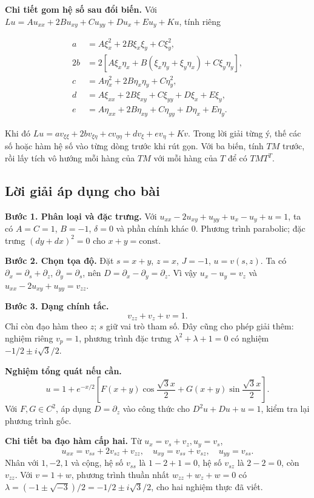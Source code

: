 \documentclass[10pt,a4paper]{article}
\begin{document}
\textbf{Chi tiết gom hệ số sau đổi biến.} Với $Lu=Au_{xx}+2Bu_{xy}+Cu_{yy}+Du_x+Eu_y+Ku$, tính riêng


\[
\begin{aligned}
a&=A\xi_x^2+2B\xi_x\xi_y+C\xi_y^2,\\
2b&=2[A\xi_x\eta_x+B(\xi_x\eta_y+\xi_y\eta_x)+C\xi_y\eta_y],\\
c&=A\eta_x^2+2B\eta_x\eta_y+C\eta_y^2,\\
d&=A\xi_{xx}+2B\xi_{xy}+C\xi_{yy}+D\xi_x+E\xi_y,\\
e&=A\eta_{xx}+2B\eta_{xy}+C\eta_{yy}+D\eta_x+E\eta_y.
\end{aligned}
\]


Khi đó $Lu=av_{\xi\xi}+2bv_{\xi\eta}+cv_{\eta\eta}+dv_\xi+ev_\eta+Kv$. Trong lời giải từng ý, thế các số hoặc hàm hệ số vào từng dòng trước khi rút gọn. Với ba biến, tính $TM$ trước, rồi lấy tích vô hướng mỗi hàng của $TM$ với mỗi hàng của $T$ để có $TMT^T$.
\subsection*{Lời giải áp dụng cho bài}
\textbf{Bước 1. Phân loại và đặc trưng.} Với $u_{xx}-2u_{xy}+u_{yy}+u_x-u_y+u=1$, ta có $A=C=1$, $B=-1$, $\delta=0$ và phần chính khác $0$. Phương trình parabolic; đặc trưng $(dy+dx)^2=0$ cho $x+y=\mathrm{const}$.

\textbf{Bước 2. Chọn tọa độ.} Đặt $s=x+y$, $z=x$, $J=-1$, $u=v(s,z)$. Ta có $\partial_x=\partial_s+\partial_z$, $\partial_y=\partial_s$, nên $D=\partial_x-\partial_y=\partial_z$. Vì vậy $u_x-u_y=v_z$ và $u_{xx}-2u_{xy}+u_{yy}=v_{zz}$.

\textbf{Bước 3. Dạng chính tắc.}
\[\boxed{v_{zz}+v_z+v=1.}\]
Chỉ còn đạo hàm theo $z$; $s$ giữ vai trò tham số. Đây cũng cho phép giải thêm: nghiệm riêng $v_p=1$, phương trình đặc trưng $\lambda^2+\lambda+1=0$ có nghiệm $-1/2\pm i\sqrt3/2$.

\textbf{Nghiệm tổng quát nếu cần.}
\[u=1+e^{-x/2}\left[F(x+y)\cos\frac{\sqrt3x}{2}+G(x+y)\sin\frac{\sqrt3x}{2}\right].\]
Với $F,G\in C^2$, áp dụng $D=\partial_z$ vào công thức cho $D^2u+Du+u=1$, kiểm tra lại phương trình gốc.

\textbf{Chi tiết ba đạo hàm cấp hai.} Từ $u_x=v_s+v_z,u_y=v_s$,
\[u_{xx}=v_{ss}+2v_{sz}+v_{zz},\quad u_{xy}=v_{ss}+v_{sz},\quad u_{yy}=v_{ss}.\]
Nhân với $1,-2,1$ và cộng, hệ số $v_{ss}$ là $1-2+1=0$, hệ số $v_{sz}$ là $2-2=0$, còn $v_{zz}$. Với $v=1+w$, phương trình thuần nhất $w_{zz}+w_z+w=0$ có $\lambda=(-1\pm\sqrt{-3})/2=-1/2\pm i\sqrt3/2$, cho hai nghiệm thực đã viết.
\end{document}

